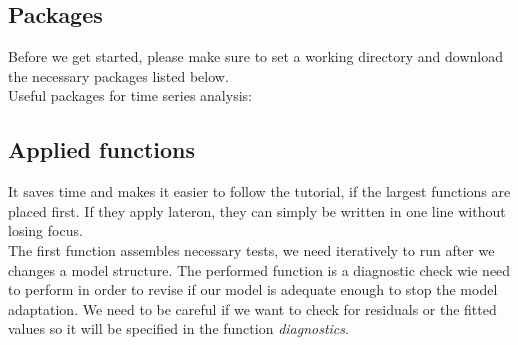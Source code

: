 \documentclass[10pt, a4paper]{article} %
\begin{document}
\subsection{Packages}
Before we get started, please make sure to set a working directory and download the necessary packages listed below.\\
\noindent Useful packages for time series analysis:
\begin{Schunk}
\end{Schunk}


\subsection{Applied functions}
\noindent It saves time and makes it easier to follow the tutorial, if the largest functions are placed first. If they apply lateron, they can simply be written in one line without losing focus. \\
The first function assembles necessary tests, we need iteratively to run after we changes a model structure.  The performed function is a diagnostic check wie need to perform in order to revise if our model is adequate enough to stop the model adaptation. We need to be careful if we want to check for residuals or the fitted values so it will be specified in the function \emph{diagnostics}.
\\
\end{document}
